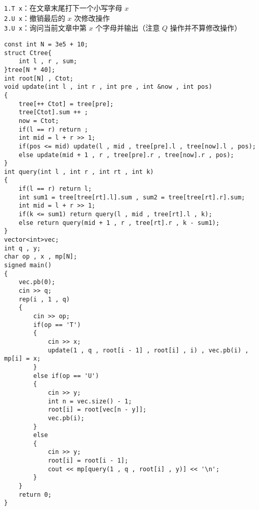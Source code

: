 \documentclass[E:/GsjzTle/main/main.tex]{subfiles}
\begin{document}
\texttt{1.T\ x}：在文章末尾打下一个小写字母 \(x\)\\
\texttt{2.U\ x}：撤销最后的 \(x\) 次修改操作\\
\texttt{3.U\ x}：询问当前文章中第 \(x\) 个字母并输出（注意 \(Q\)
操作并不算修改操作）

\begin{lstlisting}
const int N = 3e5 + 10;
struct Ctree{
	int l , r , sum;
}tree[N * 40];
int root[N] , Ctot;
void update(int l , int r , int pre , int &now , int pos)
{
	tree[++ Ctot] = tree[pre];
	tree[Ctot].sum ++ ;
	now = Ctot;
	if(l == r) return ;
	int mid = l + r >> 1;
	if(pos <= mid) update(l , mid , tree[pre].l , tree[now].l , pos);
	else update(mid + 1 , r , tree[pre].r , tree[now].r , pos);
}
int query(int l , int r , int rt , int k)
{
	if(l == r) return l;
	int sum1 = tree[tree[rt].l].sum , sum2 = tree[tree[rt].r].sum;
	int mid = l + r >> 1;
	if(k <= sum1) return query(l , mid , tree[rt].l , k);
	else return query(mid + 1 , r , tree[rt].r , k - sum1);
}
vector<int>vec;
int q , y;
char op , x , mp[N];
signed main()
{	
	vec.pb(0);
	cin >> q;
	rep(i , 1 , q)
	{
		cin >> op;	
		if(op == 'T')
		{
			cin >> x;
			update(1 , q , root[i - 1] , root[i] , i) , vec.pb(i) , mp[i] = x;
		}
		else if(op == 'U') 
		{
			cin >> y;
			int n = vec.size() - 1;
			root[i] = root[vec[n - y]];
			vec.pb(i);
		}
		else 
		{
			cin >> y;
			root[i] = root[i - 1];
			cout << mp[query(1 , q , root[i] , y)] << '\n';
		}
	}
	return 0;
}
\end{lstlisting}
\end{document}
